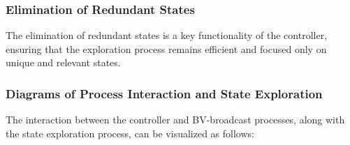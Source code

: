 \documentclass[a4paper,11pt,oneside]{report}
\begin{document}
\subsubsection{Elimination of Redundant States}
The elimination of redundant states is a key functionality of the controller, ensuring that the exploration process remains efficient and focused only on unique and relevant states.



\subsubsection{Diagrams of Process Interaction and State Exploration}
The interaction between the controller and BV-broadcast processes, along with the state exploration process, can be visualized as follows:
\end{document}
